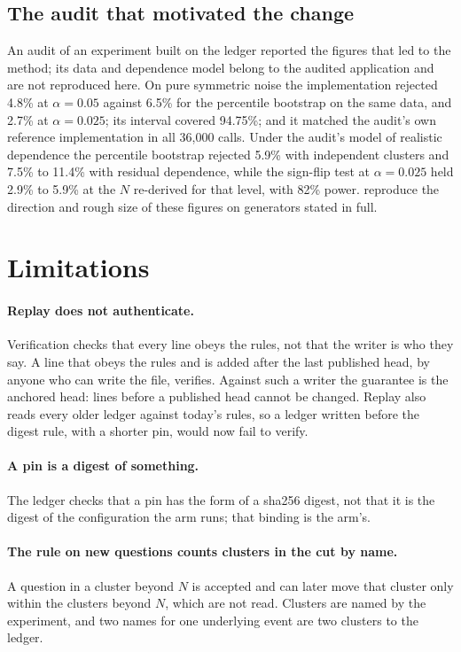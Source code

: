\documentclass[11pt]{article}
\theoremstyle{plain}
\theoremstyle{definition}
\theoremstyle{remark}
\begin{document}
\subsection{The audit that motivated the change}
An audit of an experiment built on the ledger reported the figures that led to the method; its data
and dependence model belong to the audited application and are not reproduced here. On pure
symmetric noise the implementation rejected 4.8\% at $\alpha = 0.05$ against 6.5\% for the
percentile bootstrap on the same data, and 2.7\% at $\alpha = 0.025$; its interval covered 94.75\%;
and it matched the audit's own reference implementation in all 36{,}000 calls. Under the audit's
model of realistic dependence the percentile bootstrap rejected 5.9\% with independent clusters and
7.5\% to 11.4\% with residual dependence, while the sign-flip test at $\alpha = 0.025$ held 2.9\% to
5.9\% at the $N$ re-derived for that level, with 82\% power.  reproduce the
direction and rough size of these figures on generators stated in full.

\section{Limitations}\label{sec:limits}

\paragraph{Replay does not authenticate.} Verification checks that every line obeys the rules, not
that the writer is who they say. A line that obeys the rules and is added after the last published
head, by anyone who can write the file, verifies. Against such a writer the guarantee is the
anchored head: lines before a published head cannot be changed. Replay also reads every older
ledger against today's rules, so a ledger written before the digest rule, with a shorter pin,
would now fail to verify.

\paragraph{A pin is a digest of something.} The ledger checks that a pin has the form of a sha256
digest, not that it is the digest of the configuration the arm runs; that binding is the arm's.

\paragraph{The rule on new questions counts clusters in the cut by name.} A question in a cluster
beyond $N$ is accepted and can later move that cluster only within the clusters beyond $N$, which
are not read. Clusters are named by the experiment, and two names for one underlying event are
two clusters to the ledger.
\end{document}
